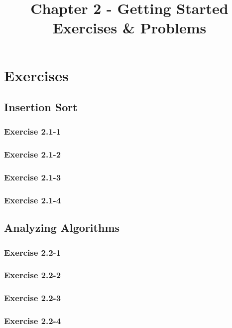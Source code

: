 \documentclass{article}
\title{Chapter 2 - Getting Started \\
Exercises \& Problems}
\date{}
\begin{document}
\maketitle
{}

\section {Exercises}
\subsection {Insertion Sort}
\subsubsection {Exercise 2.1-1}

\subsubsection {Exercise 2.1-2}

\subsubsection {Exercise 2.1-3}

\subsubsection {Exercise 2.1-4}

\subsection {Analyzing Algorithms}
\subsubsection {Exercise 2.2-1}

\subsubsection {Exercise 2.2-2}

\subsubsection {Exercise 2.2-3}

\subsubsection {Exercise 2.2-4}
\end{document}
